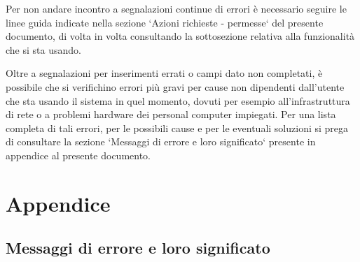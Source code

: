 \documentclass[11pt,a4paper]{article}
\begin{document}
Per non andare incontro a segnalazioni continue di errori è necessario seguire le linee guida indicate nella sezione `Azioni richieste - permesse` del presente documento, di volta in volta consultando la sottosezione relativa alla funzionalità che si sta usando.

Oltre a segnalazioni per inserimenti errati o campi dato non completati, è possibile che si verifichino errori più gravi per cause non dipendenti dall'utente che sta usando il sistema in quel momento, dovuti per esempio all'infrastruttura di rete o a problemi hardware dei personal computer impiegati.
Per una lista completa di tali errori, per le possibili cause e per le eventuali soluzioni si prega di consultare la sezione `Messaggi di errore e loro significato` presente in appendice al presente documento.
\newpage
\section{Appendice}
\subsection{Messaggi di errore e loro significato}
\end{document}
